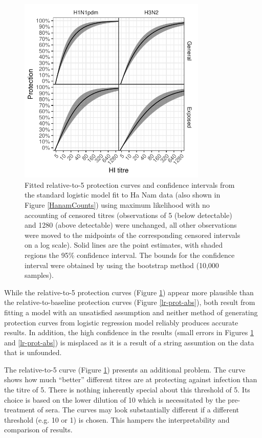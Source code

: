 \begin{figure}[htp]
	\centering
	\includegraphics[width=0.8\textwidth]{../fit-logistic-boot-plot/hanam-hi-prot-rel.pdf}
	\caption{
	Fitted relative-to-5 protection curves and confidence intervals from the standard logistic model fit to Ha Nam data (also shown in Figure \ref{HanamCounts}) using maximum likelihood with no accounting of censored titres (observations of 5 (below detectable) and 1280 (above detectable) were unchanged, all other observations were moved to the midpoints of the corresponding censored intervals on a log scale). Solid lines are the point estimates, with shaded regions the 95\% confidence interval. The bounds for the confidence interval were obtained by using the bootstrap method (10,000 samples).
	}
	\label{lr-prot-rel}
\end{figure}

While the relative-to-5 protection curves (Figure \ref{lr-prot-rel}) appear more plausible than the relative-to-baseline protection curves (Figure \ref{lr-prot-abs}), both result from fitting a model with an unsatisfied assumption and neither method of generating protection curves from logistic regression model reliably produces accurate results. In addition, the high confidence in the results (small errors in Figures \ref{lr-prot-rel} and \ref{lr-prot-abs}) is misplaced as it is a result of a string assumtion on the data that is unfounded.

The relative-to-5 curve (Figure \ref{lr-prot-rel}) presents an additional problem. The curve shows how much ``better'' different titres are at protecting against infection than the titre of 5. 
There is nothing inherently special about this threshold of 5. Its choice is based on the lower dilution of 10 which is necessitated by the pre-treatment of sera. The curves may look substantially different if a different threshold (e.g. 10 or 1) is chosen. This hampers the interpretability and comparison of results.

